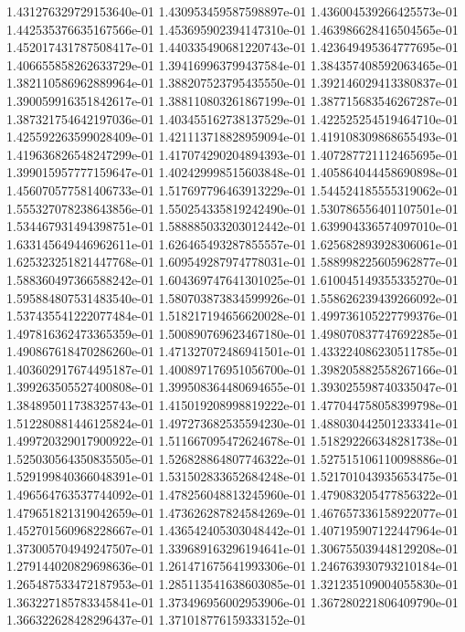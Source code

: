 1.431276329729153640e-01
1.430953459587598897e-01
1.436004539266425573e-01
1.442535376635167566e-01
1.453695902394147310e-01
1.463986628416504565e-01
1.452017431787508417e-01
1.440335490681220743e-01
1.423649495364777695e-01
1.406655858262633729e-01
1.394169963799437584e-01
1.384357408592063465e-01
1.382110586962889964e-01
1.388207523795435550e-01
1.392146029413380837e-01
1.390059916351842617e-01
1.388110803261867199e-01
1.387715683546267287e-01
1.387321754642197036e-01
1.403455162738137529e-01
1.422525254519464710e-01
1.425592263599028409e-01
1.421113718828959094e-01
1.419108309868655493e-01
1.419636826548247299e-01
1.417074290204894393e-01
1.407287721112465695e-01
1.399015957777159647e-01
1.402429998515603848e-01
1.405864044458690898e-01
1.456070577581406733e-01
1.517697796463913229e-01
1.544524185555319062e-01
1.555327078238643856e-01
1.550254335819242490e-01
1.530786556401107501e-01
1.534467931494398751e-01
1.588885033203012442e-01
1.639904336574097010e-01
1.633145649446962611e-01
1.626465493287855557e-01
1.625682893928306061e-01
1.625323251821447768e-01
1.609549287974778031e-01
1.588998225605962877e-01
1.588360497366588242e-01
1.604369747641301025e-01
1.610045149355335270e-01
1.595884807531483540e-01
1.580703873834599926e-01
1.558626239439266092e-01
1.537435541222077484e-01
1.518217194656620028e-01
1.499736105227799376e-01
1.497816362473365359e-01
1.500890769623467180e-01
1.498070837747692285e-01
1.490867618470286260e-01
1.471327072486941501e-01
1.433224086230511785e-01
1.403602917674495187e-01
1.400897176951056700e-01
1.398205882558267166e-01
1.399263505527400808e-01
1.399508364480694655e-01
1.393025598740335047e-01
1.384895011738325743e-01
1.415019208998819222e-01
1.477044758058399798e-01
1.512280881446125824e-01
1.497273682535594230e-01
1.488030442501233341e-01
1.499720329017900922e-01
1.511667095472624678e-01
1.518292266348281738e-01
1.525030564350835505e-01
1.526828864807746322e-01
1.527515106110098886e-01
1.529199840366048391e-01
1.531502833652684248e-01
1.521701043935653475e-01
1.496564763537744092e-01
1.478256048813245960e-01
1.479083205477856322e-01
1.479651821319042659e-01
1.473626287824584269e-01
1.467657336158922077e-01
1.452701560968228667e-01
1.436542405303048442e-01
1.407195907122447964e-01
1.373005704949247507e-01
1.339689163296194641e-01
1.306755039448129208e-01
1.279144020829698636e-01
1.261471675641993306e-01
1.246763930793210184e-01
1.265487533472187953e-01
1.285113541638603085e-01
1.321235109004055830e-01
1.363227185783345841e-01
1.373496956002953906e-01
1.367280221806409790e-01
1.366322628428296437e-01
1.371018776159333152e-01
